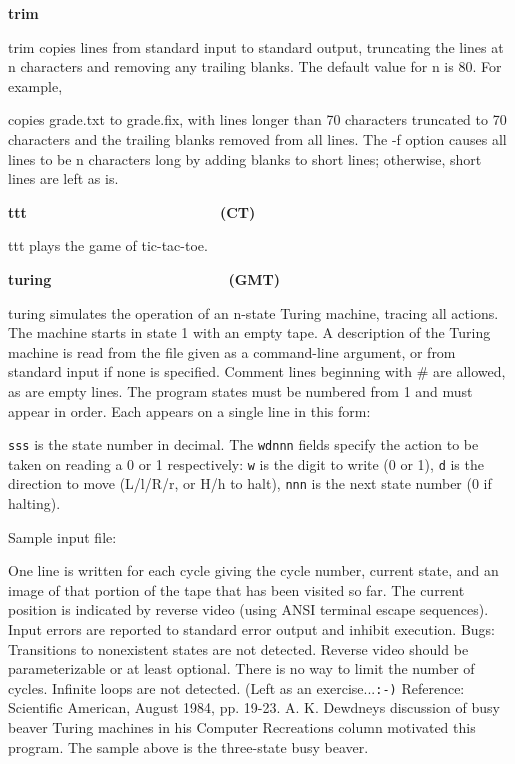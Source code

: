 {{\sffamily\bfseries
trim\ \ \ \ \ \ \ \ \ \ \ \ \ \ \ \ \ \ \ \ \ \ }

\textsf{trim} copies lines from standard input to standard output,
truncating the lines at n characters and removing any trailing blanks.
The default value for n is 80. For example,


copies \textsf{grade.txt} to \textsf{grade.fix}, with lines longer than
70 characters truncated to 70 characters and the trailing blanks
removed from all lines. The \textsf{{}-f} option causes all lines to be
n characters long by adding blanks to short lines; otherwise, short
lines are left as is.

{\sffamily\bfseries
ttt\ \ \ \ \ \ \ \ \ \ \ \ \ \ \ \ \ \ \ \ \ \  \ \ (CT)}

\textsf{ttt} plays the game of tic-tac-toe.

{\sffamily\bfseries
turing\ \ \ \ \ \ \ \ \ \ \ \ \ \ \ \ \ \ \ \ \ \ (GMT)}

\textsf{turing} simulates the operation of an n-state Turing machine, tracing all actions. The machine starts in
state 1 with an empty tape. A description of the Turing machine is read
from the file given as a command-line argument, or from standard input
if none is specified. Comment lines beginning with
{\textquotesingle}\#{\textquotesingle} are allowed, as are empty lines.
The program states must be numbered from 1 and must appear in order.
Each appears on a single line in this form:


\texttt{sss} is the state number in decimal. The \texttt{wdnnn} fields
specify the action to be taken on reading a 0 or 1 respectively:
\texttt{w} is the digit to write (0 or 1), \texttt{d} is the direction
to move (L/l/R/r, or H/h to halt), \texttt{nnn} is the next state
number (0 if halting).

Sample input file:




One line is written for each cycle giving the cycle number, current
state, and an image of that portion of the tape that has been visited
so far. The current position is indicated by reverse video (using ANSI
terminal escape sequences). Input errors are reported to standard error
output and inhibit execution. Bugs: Transitions to nonexistent states
are not detected. Reverse video should be parameterizable or at least
optional. There is no way to limit the number of cycles. Infinite loops
are not detected. (Left as an exercise...\texttt{:-)} Reference:
Scientific American, August 1984, pp. 19-23. A. K.
Dewdney{\textquotesingle}s discussion of {\textquotedbl}busy
beaver{\textquotedbl} Turing machines in his {\textquotedbl}Computer
Recreations{\textquotedbl} column motivated this program. The sample
above is the three-state busy beaver.

}
